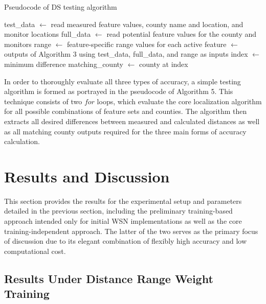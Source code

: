 \documentclass[12pt]{uthesis-v12}  %
\begin{document}
\begin{algorithm}
\caption{Pseudocode of DS testing algorithm} \label{alg-test}
\begin{algorithmic}[1]
\STATE test\_data $\leftarrow$ read measured feature values, county name and location, and monitor locations
\STATE full\_data $\leftarrow$ read potential feature values for the county and monitors
\STATE range $\leftarrow$ feature-specific range values for each active feature
		 $\leftarrow$ outputs of Algorithm 3 using test\_data, full\_data, and range as inputs
	\ENDFOR
	\STATE index $\leftarrow$ minimum difference
	\STATE matching\_county $\leftarrow$ county at index
\ENDFOR
	

\label{dst}
\end{algorithmic}
\end{algorithm}

In order to thoroughly evaluate all three types of accuracy, a simple testing algorithm is formed as portrayed in the pseudocode of Algorithm 5. This technique consists of two $for$ loops, which evaluate the core localization algorithm for all possible combinations of feature sets and counties. The algorithm then extracts all desired differences between measured and calculated distances as well as all matching county outputs required for the three main forms of accuracy calculation.

\section{Results and Discussion}

This section provides the results for the experimental setup and parameters detailed in the previous section, including the preliminary training-based approach intended only for initial WSN implementations as well as the core training-independent approach. The latter of the two serves as the primary focus of discussion due to its elegant combination of flexibly high accuracy and low computational cost.

\subsection{Results Under Distance Range Weight Training}
\end{document}
